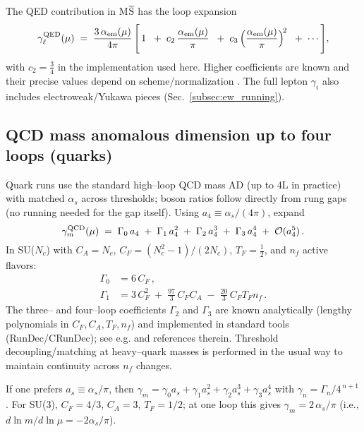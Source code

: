 \documentclass[%
  amsmath,amssymb,
  aps,
 prb,
 floatfix, showkeys
 ]{revtex4-2}
\begin{document}
 The QED contribution in M$\overline{\rm S}$ has the loop expansion
 \begin{equation}
   \gamma_{\ell}^{\rm QED}(\mu) \;=\; \frac{3\,\alpha_{\rm em}(\mu)}{4\pi}\,\Bigg[\,1\;\;+\;
   c_2\,\frac{\alpha_{\rm em}(\mu)}{\pi}\;\;+\;c_3\,\Big(\frac{\alpha_{\rm em}(\mu)}{\pi}\Big)^{\!2}\;\;+\;\cdots\Bigg],
   \label{eq:qed_gamma_series}
 \end{equation}
 with $c_2=\tfrac{3}{4}$ in the implementation used here.
 Higher coefficients are known and their precise values depend on scheme/normalization
 \cite{ChetyrkinKuehnSteinhauser2000,HerrenSteinhauser2018}.
 The full lepton $\gamma_i$ also includes electroweak/Yukawa pieces (Sec.~\ref{subsec:ew_running}).
 
 \subsection{QCD mass anomalous dimension up to four loops (quarks)}   
 \label{subsec:qcd_ad}
 Quark runs use the standard high--loop QCD mass AD (up to 4L in practice)
 with matched $\alpha_s$ across thresholds;
 boson ratios follow directly from rung gaps (no running needed for the gap itself).
 Using $a_4 \equiv \alpha_s/(4\pi)$, expand
 \begin{equation}
   \gamma_{m}^{\rm QCD}(\mu) \;=\; \Gamma_0\,a_4 \;+\; \Gamma_1\,a_4^{2} \;+\; \Gamma_2\,a_4^{3} \;+\; \Gamma_3\,a_4^{4} \;+\; \mathcal{O}(a_4^{5})\,.
   \label{eq:qcd_gamma_general}
 \end{equation}
 In SU($N_c$) with $C_A=N_c$, $C_F=(N_c^2-1)/(2N_c)$, $T_F=\tfrac{1}{2}$, and $n_f$ active flavors:
 \begin{align}
   \Gamma_0 &= 6\,C_F\,,\label{eq:qcd_G0}\\
   \Gamma_1 &= 3\,C_F^2 \;+\; \frac{97}{3}\,C_F C_A \;-\; \frac{20}{3}\,C_F T_F n_f\,.\label{eq:qcd_G1}
 \end{align}
 The three– and four–loop coefficients $\Gamma_2$ and $\Gamma_3$ are known analytically (lengthy polynomials in $C_F,C_A,T_F,n_f$) and implemented in standard tools (RunDec/CRunDec); see e.g.
 \cite{ChetyrkinKuehnSteinhauser2000,HerrenSteinhauser2018}  and references therein.
 Threshold decoupling/matching at heavy–quark masses is performed in the usual way to maintain continuity across $n_f$ changes.
 
 If one prefers $a_s\equiv\alpha_s/\pi$, then $\gamma_m = \gamma_0 a_s + \gamma_1 a_s^2 + \gamma_2 a_s^3 + \gamma_3 a_s^4$ with $\gamma_n=\Gamma_n/4^{\,n+1}$. For SU(3), $C_F=4/3$, $C_A=3$, $T_F=1/2$; at one loop this gives $\gamma_m=2\,\alpha_s/\pi$ (i.e., $d\ln m/d\ln\mu = -2\alpha_s/\pi$).
 
\end{document}
